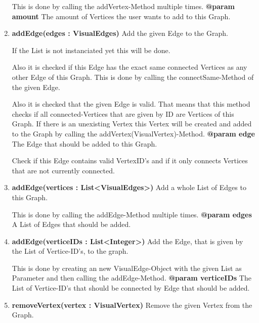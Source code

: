 \documentclass{article}
\begin{document}
\begin{enumerate}[+]
{						This is done by calling the addVertex-Method multiple times.
						\newline
						\textbf{@param amount}
							The amount of Vertices the user wants to add to this Graph.
							\newline
					}
					\item{
						\textbf{addEdge(edges : VisualEdges)} \newline
						Add the given Edge to the Graph.
						
						If the List is not instanciated yet this will be done.
						
						Also it is checked if this Edge has the exact same connected Vertices as any other Edge of this Graph.
						This is done by calling the connectSame-Method of the given Edge.
						
						Also it is checked that the given Edge is valid.
						That means that this method checks if all connected-Vertices that are given by ID are Vertices of this Graph.
						If there is an unexisting Vertex this Vertex will be created and added to the Graph by calling the addVertex(VisualVertex)-Method.
						\newline
						\textbf{@param edge}
							The Edge that should be added to this Graph.
							
							Check if this Edge contains valid VertexID's and if it only connects Vertices that are not currently connected.
							\newline
					}
					\item{
						\textbf{addEdge(vertices : List<VisualEdges>)} \newline
						Add a whole List of Edges to this Graph.
						
						This is done by calling the addEdge-Method multiple times.
						\newline
						\textbf{@param edges}
							A List of Edges that should be added.
							\newline
					}
					\item{
						\textbf{addEdge(verticeIDs : List<Integer>)} \newline
						Add the Edge, that is given by the List of Vertice-ID's, to the graph.
						
						This is done by creating an new VisualEdge-Object with the given List as Parameter and then calling the addEdge-Method.
						\newline
						\textbf{@param verticeIDs}
							The List of Vertice-ID's that should be connected by Edge that should be added.
							\newline
					}
					\item{
						\textbf{removeVertex(vertex : VisualVertex)} \newline
						Remove the given Vertex from the Graph.
						
}
\end{enumerate}
\end{document}
